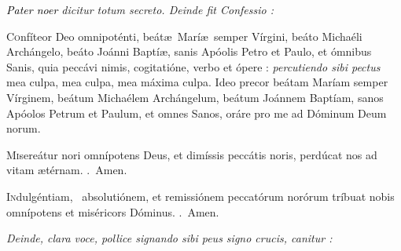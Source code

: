 \documentclass[12pt]{article} %
\def\noinitial{%
\gresetfirstlineaboveinitial{\textcolor{benred8}{\small \textsc{\textbf{}}}}{\textcolor{benred8}{\small \textsc{\textbf{}}}}
\setspaceafterinitial{0pt plus 0em minus 0em}%
\setspacebeforeinitial{0pt plus 0em minus 0em}%
\relax %
}
\newenvironment{rubric}{\vspace{2 mm}\color{benred8} \itshape \leftskip 0in \setlength{\parindent}{0.25in}}{\vspace{2 mm}}
\newenvironment{response}{\leftskip 0in \setlength{\parindent}{0in}}{\vspace{2 mm}}
\let\oldRbar\Rbar
\renewcommand{\Rbar}{\textcolor{benred8}{\oldRbar .}}
\let\oldgrealtcross\grealtcross
\renewcommand{\grealtcross}{\textcolor{benred8}{\oldgrealtcross}}
\begin{document}

\vspace{1.5mm}

\begin{rubric}
\emph{\textcolor{black}{Pater noer}} dicitur totum secreto. Deinde fit Confessio :

\end{rubric}

\begin{response}\lettrine{C}{o}nf\'{i}teor Deo omnipot\'{e}nti, be\'{a}t\ae\ Mar\'{i}\ae\ semper V\'{i}rgini, be\'{a}to Micha\'{e}li Arch\'{a}ngelo, be\'{a}to Jo\'{a}nni Bapt\'{i}\ae , sanis Ap\'{o}olis Petro et Paulo, et \'{o}mnibus Sanis, quia pecc\'{a}vi nimis, cogitati\'{o}ne, verbo et \'{o}pere : \emph{\textcolor{benred8}{percutiendo sibi pectus}} mea culpa, mea culpa, mea m\'{a}xima culpa. Ideo precor be\'{a}tam Mar\'{i}am semper V\'{i}rginem, be\'{a}tum Micha\'{e}lem Arch\'{a}ngelum, be\'{a}tum Jo\'{a}nnem Bapt\'{i}am, sanos Ap\'{o}olos Petrum et Paulum, et omnes Sanos, or\'{a}re pro me ad D\'{o}minum Deum norum.

\end{response}

\begin{response}\lettrine{M}{i}sere\'{a}tur nori omn\'{i}potens Deus, et dim\'{i}ssis pecc\'{a}tis noris, perd\'{u}cat nos ad vitam \ae t\'{e}rnam. \Rbar\ Amen.

\end{response}

\begin{response}\lettrine{I}{n}dulg\'{e}ntiam, \grealtcross\ absoluti\'{o}nem, et remissi\'{o}nem peccat\'{o}rum nor\'{o}rum tr\'{i}buat nobis omn\'{i}potens et mis\'{e}ricors D\'{o}minus. \Rbar\ Amen.

\end{response}

\begin{rubric}
Deinde, clara voce, pollice signando sibi peus signo crucis, canitur :

\end{rubric}

{\noinitial
{}

}
\end{document}
